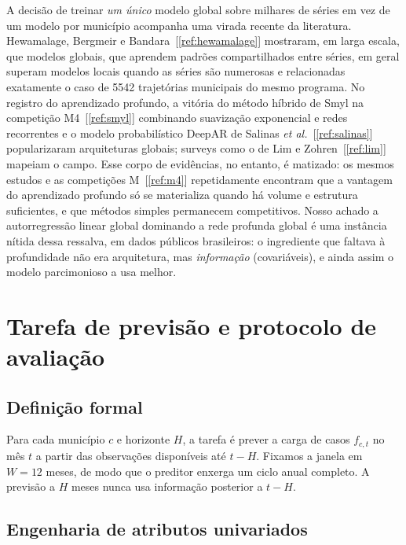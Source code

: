 \documentclass[12pt,a4paper,oneside]{article}
\newcommand{\C}[1]{[\ref{#1}]}
\begin{document}
A decisão de treinar \emph{um único} modelo global sobre milhares de
séries \textemdash{} em vez de um modelo por município \textemdash{}
acompanha uma virada recente da literatura. Hewamalage, Bergmeir e
Bandara~\C{ref:hewamalage} mostraram, em larga escala, que modelos
globais, que aprendem padrões compartilhados entre séries, em geral
superam modelos locais quando as séries são numerosas e relacionadas
\textemdash{} exatamente o caso de \num{5542} trajetórias municipais do
mesmo programa. No registro do aprendizado profundo, a vitória do método
híbrido de Smyl na competição M4~\C{ref:smyl} \textemdash{} combinando
suavização exponencial e redes recorrentes \textemdash{} e o modelo
probabilístico DeepAR de Salinas \emph{et al.}~\C{ref:salinas} popularizaram
arquiteturas globais; surveys como o de Lim e Zohren~\C{ref:lim} mapeiam o
campo. Esse corpo de evidências, no entanto, é matizado: os mesmos estudos
e as competições M~\C{ref:m4} repetidamente encontram que a vantagem do
aprendizado profundo só se materializa quando há volume e estrutura
suficientes, e que métodos simples permanecem competitivos. Nosso achado
\textemdash{} a autorregressão linear global dominando a rede profunda
global \textemdash{} é uma instância nítida dessa ressalva, em dados
públicos brasileiros: o ingrediente que faltava à profundidade não era
arquitetura, mas \emph{informação} (covariáveis), e ainda assim o modelo
parcimonioso a usa melhor.

\section{Tarefa de previsão e protocolo de avaliação}
\label{sec:tarefa}

\subsection{Definição formal}

Para cada município $c$ e horizonte $H$, a tarefa é prever a carga de casos
$f_{c,t}$ no mês $t$ a partir das observações disponíveis até $t-H$.
Fixamos a janela em $W=12$ meses, de modo que o preditor enxerga um ciclo
anual completo. A previsão a $H$ meses nunca usa informação posterior a
$t-H$.

\subsection{Engenharia de atributos univariados}
\end{document}
